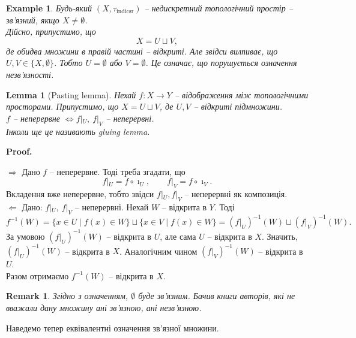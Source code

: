 \documentclass[a4paper, 10pt]{article}
\makeatletter
\def\rightproof{$\boxed{\Rightarrow}$ }
\def\leftproof{$\boxed{\Leftarrow}$ }
\theoremstyle{theoremdd}
\newtheorem{example}[theorem]{Example}
\newtheorem{remark}[theorem]{Remark}
\newtheorem{lemma}[theorem]{Lemma}
\renewenvironment{proof}[1][Proof.\\]{\par
\pushQED{\hfill \qed}%
\normalfont \topsep6\p@\@plus6\p@\relax
\trivlist
\item\relax
{\bfseries
#1\@addpunct{.}}\hspace\labelsep\ignorespaces
}{%
\popQED\endtrivlist\@endpefalse
}
\makeatother
\begin{document}
\begin{example}
Будь-який $(X,\tau_{\text{indicsr}})$ -- недискретний топологічний простір -- зв'язний, якщо $X \neq \emptyset$.\\
Дійсно, припустимо, що \[
X = U \sqcup V,
\] де обидва множини в правій частині -- відкриті. Але звідси вилпиває, що $U,V \in \{X, \emptyset\}$. Тобто $U = \emptyset$ або $V = \emptyset$. Це означає, що порушується означення незв'язності.
\end{example}

\begin{lemma}[Pasting lemma]
Нехай $f \colon X \to Y$ -- відображення між топологічними просторами. Припустимо, що $X = U \sqcup V$, де $U,V$ -- відкриті підмножини.\\
$f$ -- неперервне $\iff f|_U,\ f|_V$ -- неперервні.\\
\textit{Інколи ще це називають gluing lemma.}
\end{lemma}

\begin{proof}
\rightproof Дано $f$ -- неперервне. Тоді треба згадати, що 
\[
f|_U = f \circ \imath_U, \qquad f|_V = f \circ \imath_V.
\]
Вкладення вже неперервне, тобто звідси $f|_U, f|_V$ -- неперервні як композиція.
\bigskip \\
\leftproof Дано: $f|_U,\ f|_V$ -- неперервні. Нехай $W$ -- відкрита в $Y$. Тоді
\[
f^{-1}(W) = \{x \in U \mid f(x) \in W\} \sqcup \{x \in V \mid f(x) \in W\} = (f|_U)^{-1}(W) \sqcup (f|_V)^{-1}(W).
\]
За умовою $(f|_U)^{-1}(W)$ -- відкрита в $U$, але сама $U$ -- відкрита в $X$. Значить, $(f|_U)^{-1}(W)$ -- відкрита в $X$. Аналогічним чином $(f|_V)^{-1}(W)$ -- відкрита в $U$.\\
Разом отримаємо $f^{-1}(W)$ -- відкрита в $X$.
\end{proof}

\begin{remark}
Згідно з означенням, $\emptyset$ буде зв'язним. Бачив книги авторів, які не вважали дану множину ані зв'язною, ані незв'язною.
\end{remark}

\noindent
Наведемо тепер еквівалентні означення зв'язної множини.
\end{document}
